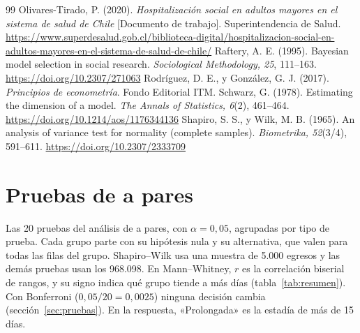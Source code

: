 \documentclass[10.5pt,a4paper,headings=small,abstract=false,bibliography=totoc,listof=totoc]{scrartcl}
\begin{document}
\begin{thebibliography}{99}
 Olivares-Tirado, P. (2020). \emph{Hospitalización social en adultos mayores en el sistema de salud de Chile} [Documento de trabajo]. Superintendencia de Salud. \url{https://www.superdesalud.gob.cl/biblioteca-digital/hospitalizacion-social-en-adultos-mayores-en-el-sistema-de-salud-de-chile/}
 Raftery, A. E. (1995). Bayesian model selection in social research. \emph{Sociological Methodology, 25}, 111--163. \url{https://doi.org/10.2307/271063}
 Rodríguez, D. E., y González, G. J. (2017). \emph{Principios de econometría}. Fondo Editorial ITM.
 Schwarz, G. (1978). Estimating the dimension of a model. \emph{The Annals of Statistics, 6}(2), 461--464. \url{https://doi.org/10.1214/aos/1176344136}
 Shapiro, S. S., y Wilk, M. B. (1965). An analysis of variance test for normality (complete samples). \emph{Biometrika, 52}(3/4), 591--611. \url{https://doi.org/10.2307/2333709}
\end{thebibliography}

\appendix
\renewcommand*{\sectionformat}{Anexo~\thesection.\enskip}
\renewcommand*{\addsectiontocentry}[2]{\addtocentrydefault{section}{}{Anexo~#1.\enskip #2}}
\renewcommand{\thetable}{\thesection\arabic{table}}
\renewcommand{\thefigure}{\thesection\arabic{figure}}

\clearpage
\section{Pruebas de a pares}\label{anx:pares}

Las 20 pruebas del análisis de a pares, con $\alpha=0{,}05$, agrupadas por tipo de prueba. Cada grupo parte con su hipótesis nula y su alternativa, que valen para todas las filas del grupo. Shapiro--Wilk usa una muestra de 5.000 egresos y las demás pruebas usan los 968.098. En Mann--Whitney, $r$ es la correlación biserial de rangos, y su signo indica qué grupo tiende a más días (tabla~\ref{tab:resumen}). Con Bonferroni ($0{,}05/20=0{,}0025$) ninguna decisión cambia (sección~\ref{sec:pruebas}). En la respuesta, «Prolongada» es la estadía de más de 15 días.
\end{document}
